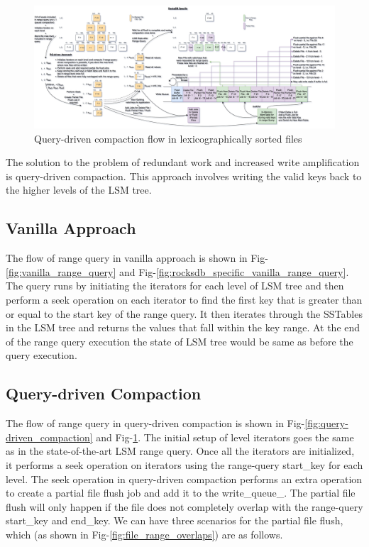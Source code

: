 \begin{figure}
    \includegraphics[scale=0.10]{Figures/RQ-driven rocksdb specific.png}
    \caption{Query-driven compaction flow in lexicographically sorted files}\label{fig:rocksdb_specific_query-driven_compaction}
\end{figure}

The solution to the problem of redundant work and increased write amplification is query-driven compaction. This 
approach involves writing the valid keys back to the higher levels of the LSM tree.

\subsection{Vanilla Approach}
The flow of range query in vanilla approach is shown in Fig-\ref{fig:vanilla_range_query} and 
Fig-\ref{fig:rocksdb_specific_vanilla_range_query}. The query runs by 
initiating the iterators for each level of LSM tree and then perform a seek operation on each iterator to find the 
first key that is greater than or equal to the start key of the range query. It then iterates through the
SSTables in the LSM tree and returns the values that fall within the key range. At the end of the range query
execution the state of LSM tree would be same as before the query execution.

\subsection{Query-driven Compaction}
The flow of range query in query-driven compaction is shown in Fig-\ref{fig:query-driven_compaction} and 
Fig-\ref{fig:rocksdb_specific_query-driven_compaction}. The initial 
setup of level iterators goes the same as in the state-of-the-art LSM range query. Once all the iterators are 
initialized, it performs a seek operation on iterators using the range-query start\_key for each level. The seek 
operation in query-driven compaction performs an extra operation to create a partial file flush job and add it to the 
write\_queue\_. The partial file flush will only happen if the file does not completely overlap with the range-query 
start\_key and end\_key. We can have three scenarios for the partial file flush, which 
(as shown in Fig-\ref{fig:file_range_overlaps}) are as follows.

